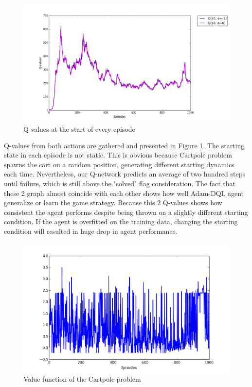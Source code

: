         \begin{figure}[H]
            \centering
            \includegraphics[scale=0.3]{images/qvaluecartpole.png}
            \caption{Q values at the start of every episode}
            \label{fig:cartpole2}
        \end{figure}
        Q-values from both actions are gathered and presented in Figure \ref{fig:cartpole2}. The starting state in each episode is not static. This is obvious because Cartpole problem spawns the cart on a random position, generating different starting dynamics each time. Nevertheless, our Q-network predicts an average of two hundred steps until failure, which is still above the "solved" flag consideration. The fact that these 2 graph almost coincide with each other shows how well Adam-DQL agent generalize or learn the game strategy. Because this 2 Q-values shows how consistent the agent performs despite being thrown on a slightly different starting condition. If the agent is overfitted on the training data, changing the starting condition will resulted in huge drop in agent performance.
        \iffalse
        \begin{figure}[H]
            \centering
            \includegraphics[scale=0.4]{images/value.png}
            \caption{Value function of the Cartpole problem}
            \label{fig:cartpole3}
        \end{figure}

